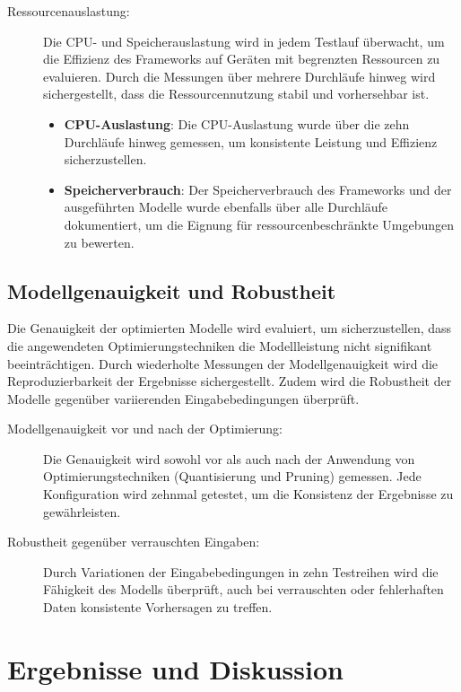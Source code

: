 \begin{description}
\item[Ressourcenauslastung:] Die CPU- und Speicherauslastung wird in jedem Testlauf überwacht, um die Effizienz des Frameworks auf Geräten mit begrenzten Ressourcen zu evaluieren. Durch die Messungen über mehrere Durchläufe hinweg wird sichergestellt, dass die Ressourcennutzung stabil und vorhersehbar ist.
\begin{itemize}
    \item \textbf{CPU-Auslastung}: Die CPU-Auslastung wurde über die zehn Durchläufe hinweg gemessen, um konsistente Leistung und Effizienz sicherzustellen.
    \item \textbf{Speicherverbrauch}: Der Speicherverbrauch des Frameworks und der ausgeführten Modelle wurde ebenfalls über alle Durchläufe dokumentiert, um die Eignung für ressourcenbeschränkte Umgebungen zu bewerten.
\end{itemize}
\end{description}

\subsection{Modellgenauigkeit und Robustheit}

Die Genauigkeit der optimierten Modelle wird evaluiert, um sicherzustellen, dass die angewendeten Optimierungstechniken die Modellleistung nicht signifikant beeinträchtigen. Durch wiederholte Messungen der Modellgenauigkeit wird die Reproduzierbarkeit der Ergebnisse sichergestellt. Zudem wird die Robustheit der Modelle gegenüber variierenden Eingabebedingungen überprüft.

\begin{description}
\item[Modellgenauigkeit vor und nach der Optimierung:] Die Genauigkeit wird sowohl vor als auch nach der Anwendung von Optimierungstechniken (Quantisierung und Pruning) gemessen. Jede Konfiguration wird zehnmal getestet, um die Konsistenz der Ergebnisse zu gewährleisten.
\item[Robustheit gegenüber verrauschten Eingaben:] Durch Variationen der Eingabebedingungen in zehn Testreihen wird die Fähigkeit des Modells überprüft, auch bei verrauschten oder fehlerhaften Daten konsistente Vorhersagen zu treffen.
\end{description}

\section{Ergebnisse und Diskussion}

